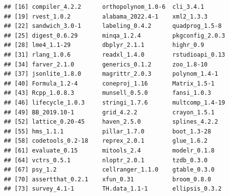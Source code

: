 \documentclass[11pt,a4paper,twoside]{book}\usepackage[]{graphicx}\usepackage[]{xcolor}
\makeatletter
\newenvironment{kframe}{%
 \def\at@end@of@kframe{}%
 \ifinner\ifhmode%
  \def\at@end@of@kframe{\end{minipage}}%
  \begin{minipage}{\columnwidth}%
 \fi\fi%
 \def\FrameCommand##1{\hskip\@totalleftmargin \hskip-\fboxsep
 \colorbox{shadecolor}{##1}\hskip-\fboxsep
     \hskip-\linewidth \hskip-\@totalleftmargin \hskip\columnwidth}%
 \MakeFramed {\advance\hsize-\width
   \@totalleftmargin\z@ \linewidth\hsize
   \@setminipage}}%
 {\par\unskip\endMakeFramed%
 \at@end@of@kframe}
\newenvironment{knitrout}{}{} %
\makeatother
\begin{document}
\begin{knitrout}
\begin{kframe}
\begin{verbatim}
## [16] compiler_4.2.2      orthopolynom_1.0-6  cli_3.4.1          
## [19] rvest_1.0.2         alabama_2022.4-1    xml2_1.3.3         
## [22] sandwich_3.0-1      labeling_0.4.2      quadprog_1.5-8     
## [25] digest_0.6.29       minqa_1.2.4         pkgconfig_2.0.3    
## [28] lme4_1.1-29         dbplyr_2.1.1        highr_0.9          
## [31] rlang_1.0.6         readxl_1.4.0        rstudioapi_0.13    
## [34] farver_2.1.0        generics_0.1.2      zoo_1.8-10         
## [37] jsonlite_1.8.0      magrittr_2.0.3      polynom_1.4-1      
## [40] Formula_1.2-4       coneproj_1.16       Matrix_1.5-1       
## [43] Rcpp_1.0.8.3        munsell_0.5.0       fansi_1.0.3        
## [46] lifecycle_1.0.3     stringi_1.7.6       multcomp_1.4-19    
## [49] BB_2019.10-1        grid_4.2.2          crayon_1.5.1       
## [52] lattice_0.20-45     haven_2.5.0         splines_4.2.2      
## [55] hms_1.1.1           pillar_1.7.0        boot_1.3-28        
## [58] codetools_0.2-18    reprex_2.0.1        glue_1.6.2         
## [61] evaluate_0.15       mitools_2.4         modelr_0.1.8       
## [64] vctrs_0.5.1         nloptr_2.0.1        tzdb_0.3.0         
## [67] psy_1.2             cellranger_1.1.0    gtable_0.3.0       
## [70] assertthat_0.2.1    xfun_0.31           broom_0.8.0        
## [73] survey_4.1-1        TH.data_1.1-1       ellipsis_0.3.2
\end{verbatim}
\end{kframe}
\end{knitrout}





\cleardoublepage
{}
{}


 


\cleardoublepage
\end{document}
